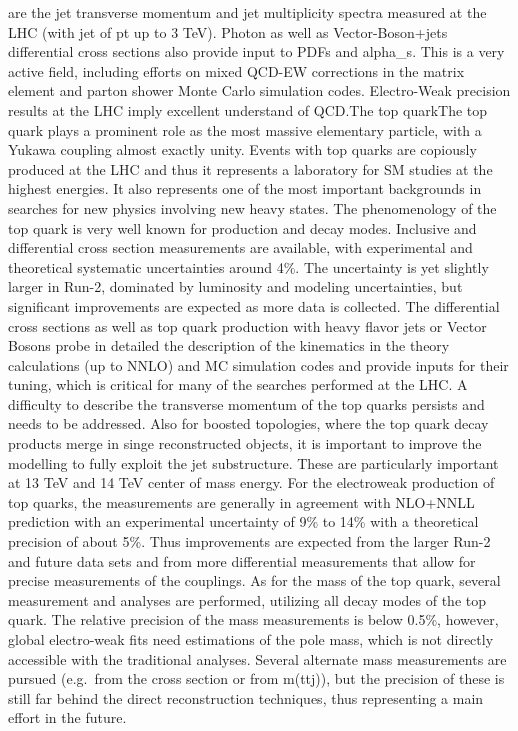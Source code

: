 are the jet transverse momentum and jet multiplicity spectra measured at
the LHC (with jet of pt up to 3 TeV). Photon as well as
Vector-Boson+jets differential cross sections also provide input to PDFs
and alpha\_s. This is a very active field, including efforts on mixed
QCD-EW corrections in the matrix element and parton shower Monte Carlo
simulation codes. Electro-Weak precision results at the LHC imply
excellent understand of QCD.The top quarkThe top quark plays a prominent
role as the most massive elementary particle, with a Yukawa coupling
almost exactly unity. Events with top quarks are copiously produced at
the LHC and thus it represents a laboratory for SM studies at the
highest energies. It also represents one of the most important
backgrounds in searches for new physics involving new heavy states. The
phenomenology of the top quark is very well known for production and
decay modes. Inclusive and differential cross section measurements are
available, with experimental and theoretical systematic uncertainties
around 4\%. The uncertainty is yet slightly larger in Run-2, dominated
by luminosity and modeling uncertainties, but significant improvements
are expected as more data is collected. The differential cross sections
as well as top quark production with heavy flavor jets or Vector Bosons
probe in detailed the description of the kinematics in the theory
calculations (up to NNLO) and MC simulation codes and provide inputs for
their tuning, which is critical for many of the searches performed at
the LHC. A difficulty to describe the transverse momentum of the top
quarks persists and needs to be addressed. Also for boosted topologies,
where the top quark decay products merge in singe reconstructed objects,
it is important to improve the modelling to fully exploit the jet
substructure. These are particularly important at 13 TeV and 14 TeV
center of mass energy. For the electroweak production of top quarks, the
measurements are generally in agreement with NLO+NNLL prediction with an
experimental uncertainty of 9\% to 14\% with a theoretical precision of
about 5\%. Thus improvements are expected from the larger Run-2 and
future data sets and from more differential measurements that allow for
precise measurements of the couplings. As for the mass of the top quark,
several measurement and analyses are performed, utilizing all decay
modes of the top quark. The relative precision of the mass measurements
is below 0.5\%, however, global electro-weak fits need estimations of
the pole mass, which is not directly accessible with the traditional
analyses. Several alternate mass measurements are pursued (e.g.~from the
cross section or from m(ttj)), but the precision of these is still far
behind the direct reconstruction techniques, thus representing a main
effort in the future.